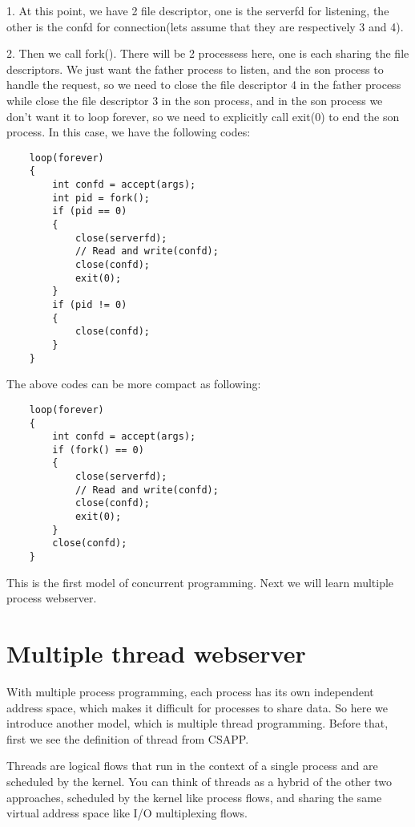 \documentclass{article}
\begin{document}
\begin{CJK}{UTF8}{gbsn}
    1. At this point, we have 2 file descriptor, one is the serverfd for listening, the other is the confd for connection(lets assume that they are respectively 3 and 4).

    2. Then we call fork(). There will be 2 processess here, one is each sharing the file descriptors. We just want the father process to listen, and the son process to handle the request, so we need to close the file descriptor 4 in the father process while close the file descriptor 3 in the son process, and in the son process we don't want it to loop forever, so we need to explicitly call exit(0) to end the son process. In this case, we have the following codes:

\begin{verbatim}
    loop(forever)
    {
        int confd = accept(args);
        int pid = fork();
        if (pid == 0)
        {
            close(serverfd);
            // Read and write(confd);
            close(confd);
            exit(0);
        }
        if (pid != 0)
        {
            close(confd);
        }
    }
\end{verbatim}

    The above codes can be more compact as following:

\begin{verbatim}
    loop(forever)
    {
        int confd = accept(args);
        if (fork() == 0)
        {
            close(serverfd);
            // Read and write(confd);
            close(confd);
            exit(0);
        }
        close(confd);
    }
\end{verbatim}

    This is the first model of concurrent programming. Next we will learn multiple process webserver.

\section*{Multiple thread webserver}

    With multiple process programming, each process has its own independent address space, which makes it difficult for processes to share data. So here we introduce another model, which is multiple thread programming. Before that, first we see the definition of thread from CSAPP.

\begin{displayquote}
    Threads are logical flows that run in the context of a single process and are scheduled by the kernel. You can think of threads as a hybrid of the
other two approaches, scheduled by the kernel like process flows, and sharing the same virtual address space like I/O multiplexing flows.
\end{displayquote}


\end{CJK}
\end{document}
